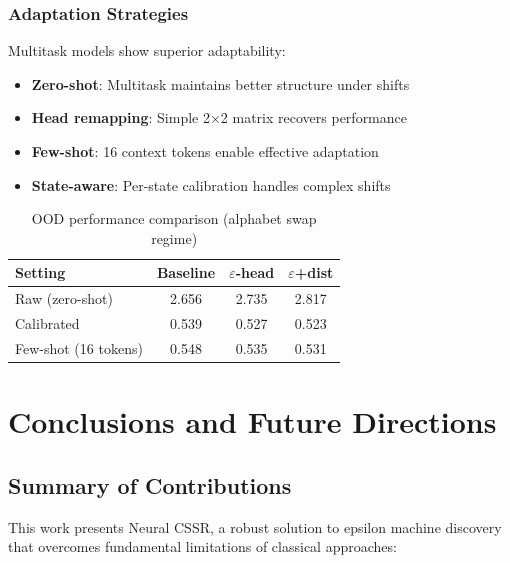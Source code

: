 \documentclass[11pt,a4paper]{report}
\newcommand{\epsmachine}{\varepsilon}
\theoremstyle{definition}
\begin{document}
\subsection{Adaptation Strategies}

\begin{keyresult}
Multitask models show superior adaptability:

\begin{itemize}
    \item \textbf{Zero-shot}: Multitask maintains better structure under shifts
    \item \textbf{Head remapping}: Simple 2×2 matrix recovers performance
    \item \textbf{Few-shot}: 16 context tokens enable effective adaptation
    \item \textbf{State-aware}: Per-state calibration handles complex shifts
\end{itemize}
\end{keyresult}

\begin{table}[htbp]
\centering
\caption{OOD performance comparison (alphabet swap regime)}
\label{tab:ood-alphabet}
\begin{tabular}{@{}lccc@{}}
\toprule
\textbf{Setting} & \textbf{Baseline} & \textbf{$\epsmachine$-head} & \textbf{$\epsmachine$+dist} \\
\midrule
Raw (zero-shot) & 2.656 & 2.735 & 2.817 \\
Calibrated & 0.539 & 0.527 & \cellcolor{highlightgreen}0.523 \\
Few-shot (16 tokens) & 0.548 & 0.535 & \cellcolor{highlightgreen}0.531 \\
\bottomrule
\end{tabular}
\end{table}

\chapter{Conclusions and Future Directions}
\label{ch:conclusions}

\section{Summary of Contributions}
\label{sec:summary}

This work presents Neural CSSR, a robust solution to epsilon machine discovery that overcomes fundamental limitations of classical approaches:
\end{document}

